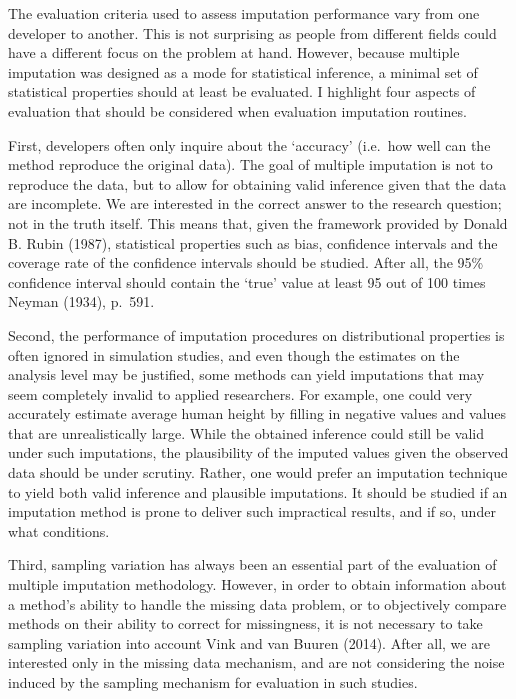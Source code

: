\documentclass[
]{article}
\begin{document}
The evaluation criteria used to assess imputation performance vary from
one developer to another. This is not surprising as people from
different fields could have a different focus on the problem at hand.
However, because multiple imputation was designed as a mode for
statistical inference, a minimal set of statistical properties should at
least be evaluated. I highlight four aspects of evaluation that should
be considered when evaluation imputation routines.

First, developers often only inquire about the `accuracy' (i.e.~how well
can the method reproduce the original data). The goal of multiple
imputation is not to reproduce the data, but to allow for obtaining
valid inference given that the data are incomplete. We are interested in
the correct answer to the research question; not in the truth itself.
This means that, given the framework provided by Donald B. Rubin (1987),
statistical properties such as bias, confidence intervals and the
coverage rate of the confidence intervals should be studied. After all,
the 95\% confidence interval should contain the `true' value at least 95
out of 100 times Neyman (1934), p.~591.

Second, the performance of imputation procedures on distributional
properties is often ignored in simulation studies, and even though the
estimates on the analysis level may be justified, some methods can yield
imputations that may seem completely invalid to applied researchers. For
example, one could very accurately estimate average human height by
filling in negative values and values that are unrealistically large.
While the obtained inference could still be valid under such
imputations, the plausibility of the imputed values given the observed
data should be under scrutiny. Rather, one would prefer an imputation
technique to yield both valid inference and plausible imputations. It
should be studied if an imputation method is prone to deliver such
impractical results, and if so, under what conditions.

Third, sampling variation has always been an essential part of the
evaluation of multiple imputation methodology. However, in order to
obtain information about a method's ability to handle the missing data
problem, or to objectively compare methods on their ability to correct
for missingness, it is not necessary to take sampling variation into
account Vink and van Buuren (2014). After all, we are interested only in
the missing data mechanism, and are not considering the noise induced by
the sampling mechanism for evaluation in such studies.
\end{document}
